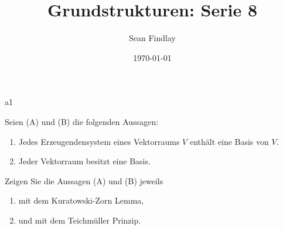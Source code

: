 \documentclass[12pt]{article}
\title{Grundstrukturen: Serie 8}
\author{Sean Findlay}
\date{\today}
\begin{document}
\maketitle

\begin{problem}[Aufgabe]{}{a1}

Seien (A) und (B) die folgenden Aussagen:

    
    \begin{enumerate}[label=(\Alph*)]
        \item Jedes Erzeugendensystem eines Vektorraums $V$ enthält eine Basis von $V$.
        \item Jeder Vektorraum besitzt eine Basis.
    \end{enumerate}
    
    Zeigen Sie die Aussagen (A) und (B) jeweils
    
    \begin{enumerate}[label=(\alph*)]
        \item mit dem Kuratowski-Zorn Lemma,
        \item und mit dem Teichmüller Prinzip.
    \end{enumerate}

\end{problem}
\end{document}
